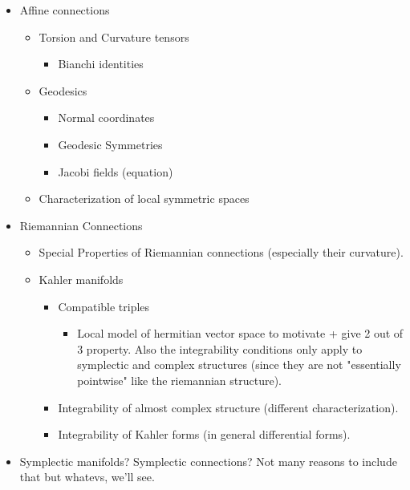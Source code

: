 \documentclass{report}
\theoremstyle{definition}
\begin{document}
\begin{itemize}
\begin{itemize}
        \item Affine connections
        \begin{itemize}
            \item Torsion and Curvature tensors
            \begin{itemize}
                \item Bianchi identities
            \end{itemize}
            \item Geodesics
            \begin{itemize}
                \item Normal coordinates
                \item Geodesic Symmetries
                \item Jacobi fields (equation)
            \end{itemize}
            \item Characterization of local symmetric spaces
        \end{itemize}
        \item Riemannian Connections
        \begin{itemize}
            \item Special Properties of Riemannian connections (especially their curvature).
            \item Kahler manifolds
            \begin{itemize}
                \item Compatible triples
                \begin{itemize}
                    \item Local model of hermitian vector space to motivate + give 2 out of 3 property. Also the integrability conditions only apply to symplectic and complex structures (since they are not "essentially pointwise" like the riemannian structure).
                \end{itemize}
                \item Integrability of almost complex structure (different characterization).
                \item Integrability of Kahler forms (in general differential forms).
            \end{itemize}
        \end{itemize}
        \item Symplectic manifolds? Symplectic connections? Not many reasons to include that but whatevs, we'll see.
    \end{itemize}
\end{itemize}
\end{document}
